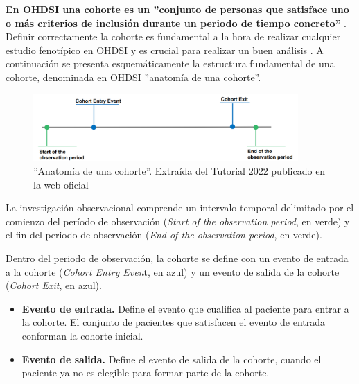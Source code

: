 
\textbf{En OHDSI una cohorte es un ''conjunto de personas que satisface uno o más criterios de inclusión durante un periodo de tiempo concreto''} \parencite{OHDSIbook}. Definir correctamente la cohorte es fundamental a la hora de realizar cualquier estudio fenotípico en OHDSI y es crucial para realizar un buen análisis \parencite{hripcsak2018high}. A continuación se presenta esquemáticamente la estructura fundamental de una cohorte, denominada en OHDSI ''anatomía de una cohorte''.

\begin{figure}[H]
\centering
\includegraphics[width=0.90\textwidth]{figures/cohortAnatomy.png}
     \caption{''Anatomía de una cohorte''. Extraída del Tutorial 2022 publicado en la web oficial \parencite{OHDSIwebsite}}
    \label{fig:cohortAnatomy}
\end{figure}

La investigación observacional comprende un intervalo temporal delimitado por el comienzo del período de  observación (\textit{Start of the observation period}, en verde) y el fin del periodo de observación (\textit{End of the observation period}, en verde).

Dentro del periodo de observación, la cohorte se define con un  evento de entrada a la cohorte (\textit{Cohort Entry Even}t, en azul) y un evento de salida de la cohorte (\textit{Cohort Exit}, en azul). 

\begin{itemize}

    \item \textbf{Evento de entrada.} Define el evento que cualifica al paciente para entrar a la cohorte. El conjunto de pacientes que satisfacen el evento de entrada conforman la cohorte inicial. 

    \item \textbf{Evento de salida.} Define el evento de salida de la cohorte, cuando el paciente ya no es elegible para formar parte de la cohorte.

\end{itemize}

